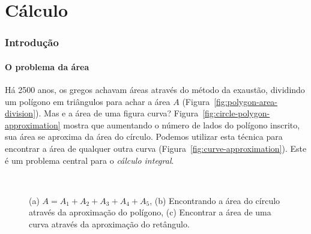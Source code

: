 \clearpage\part{Cálculo}
\section{Introdução}

\subsection{O problema da área}
Há 2500 anos, os gregos achavam áreas através do método da exaustão, dividindo um polígono em triângulos para achar a área $A$ (Figura~\ref{fig:polygon-area-division}). Mas e a área de uma figura curva?  Figura~\ref{fig:circle-polygon-approximation} mostra que aumentando o número de lados do polígono inscrito, sua área se aproxima da área do círculo. Podemos utilizar esta técnica para encontrar a área de qualquer outra curva (Figura~\ref{fig:curve-approximation}). Este é um problema central para o \emph{cálculo integral}.\vspace{-0.6cm}
\begin{figure}[!ht]
  \vspace{-0.3cm}
  \\
  
  \caption{(a) $A = A_1+A_2+A_3+A_4+A_5$, (b) Encontrando a área do círculo através da aproximação do polígono, (c) Encontrar a área de uma curva através da aproximação do retângulo.}
\end{figure}

